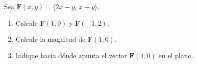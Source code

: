 Sea $\mathbf{F}(x,y)=\langle 2x-y,\,x+y\rangle$.
\begin{enumerate}
    \item Calcule $\mathbf{F}(1,0)$ y $\mathbf{F}(-1,2)$.
    \item Calcule la magnitud de $\mathbf{F}(1,0)$.
    \item Indique hacia dónde apunta el vector $\mathbf{F}(1,0)$ en el plano.
\end{enumerate}
